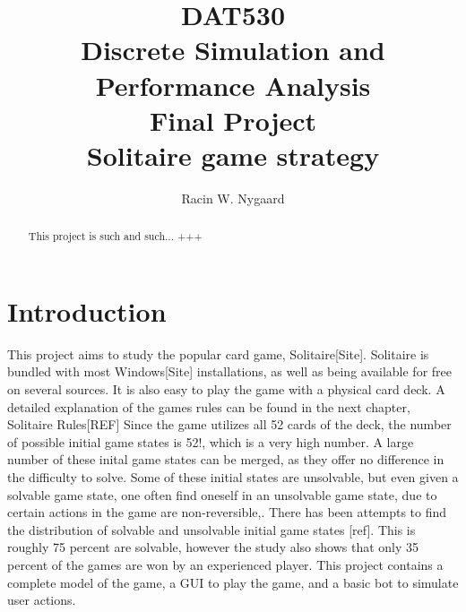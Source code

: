 \documentclass[runningheads,a4paper]{llncs}
\begin{document}
\mainmatter  %
\title{DAT530\\Discrete Simulation and Performance Analysis\\Final Project\\Solitaire game strategy}
\author{Racin W. Nygaard}

\tocauthor{ }
\maketitle
	


\begin{abstract}
This project is such and such... +++

\end{abstract}

\setcounter{tocdepth}{3}
\setcounter{secnumdepth}{3}

\tableofcontents
\listoffigures
\listoftables
\printacronyms[name=Abbreviations,include-classes=abbrev]
\printacronyms[name=Nomenclature,include-classes=nomencl]
\section{Introduction}
This project aims to study the popular card game, Solitaire[Site]. Solitaire is bundled with most Windows[Site] installations, as well as being available for free on several sources. It is also easy to play the game with a physical card deck. A detailed explanation of the games rules can be found in the next chapter, Solitaire Rules[REF]
\newline
Since the game utilizes all 52 cards of the deck, the number of possible initial game states is 52!, which is a very high number. A large number of these inital game states can be merged, as they offer no difference in the difficulty to solve. Some of these initial states are unsolvable, but even given a solvable game state, one often find oneself in an unsolvable game state, due to certain actions in the game are non-reversible,. There has been attempts to find the distribution of solvable and unsolvable initial game states [ref]. This is roughly 75 percent are solvable, however the study also shows that only 35 percent of the games are won by an experienced player.
\newline
This project contains a complete model of the game, a GUI to play the game, and a basic bot to simulate user actions. 
\end{document}
